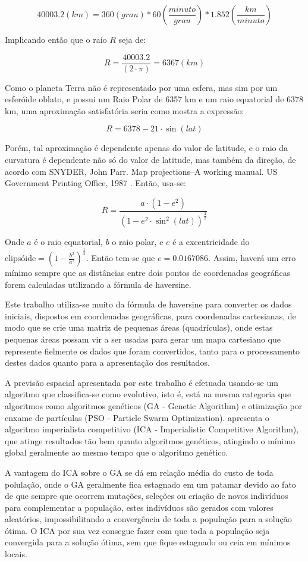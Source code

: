\[40003.2 (km) = 360(grau) * 60\left(\frac{minuto}{grau}\right) * 1.852\left(\frac{km}{minuto}\right)  \]

Implicando então que o raio \(R\) seja de:

\[R = \frac{40003.2}{(2 \cdot \pi)} = 6367 (km) \]

Como o planeta Terra não é representado por uma esfera, mas sim por um esferóide oblato, e possui um Raio Polar de 6357 km e um raio equatorial de 6378 km, uma aproximação satisfatória seria como mostra a expressão:

\[R = 6378 - 21 \cdot \sin(lat) \]

Porém, tal aproximação é dependente apenas do valor de latitude, e o raio da curvatura é dependente não só do valor de latitude, mas também da direção, de acordo com SNYDER, John Parr. Map projections--A working manual. US Government Printing Office, 1987 \cite{snyder1987map}. Então, usa-se:

\[R = \frac{ a \cdot (1 - e^2)}{ (1 - e^2 \cdot \sin^2(lat))^\frac{3}{2}}\]

Onde \(a\) é o raio equatorial, \(b\) o raio polar, e \(e\) é a excentricidade do 
\(\text{elipsóide} = \left(1 - \frac{b^2}{a^2}\right)^\frac{1}{2}\). 
Então tem-se que \(e = 0.0167086\). Assim, haverá um erro mínimo sempre que as distâncias entre dois pontos de coordenadas geográficas forem calculadas utilizando a fórmula de haversine.

Este trabalho utiliza-se muito da fórmula de haversine para converter os dados iniciais, dispostos em coordenadas geográficas, para coordenadas cartesianas, de modo que se crie uma matriz de pequenas áreas (quadrículas), onde estas pequenas áreas possam vir a ser usadas para gerar um mapa cartesiano que represente fielmente os dados que foram convertidos, tanto para o processamento destes dados quanto para a apresentação dos resultados.

A previsão espacial apresentada por este trabalho é efetuada usando-se um algoritmo que classifica-se como evolutivo, isto é, está na mesma categoria que algoritmos como algoritmos genéticos \cite{mitchell1998introduction} (GA - Genetic Algorithm) e otimização por enxame de partículas (PSO - Particle Swarm Optimization). \cite{atashpaz2007imperialist} apresenta o algoritmo imperialista competitivo (ICA - Imperialistic Competitive Algorithm), que atinge resultados tão bem quanto algoritmos genéticos, atingindo o mínimo global geralmente ao mesmo tempo que o algoritmo genético. 

A vantagem do ICA  sobre o GA se dá em relação média do custo de toda polulação, onde o GA geralmente fica estagnado em um patamar devido ao fato de que sempre que ocorrem mutações, seleções ou criação de novos indivíduos para complementar a população, estes indivíduos são gerados com valores aleatórios, impossibilitando a convergência de toda a população para a solução ótima. O ICA por sua vez consegue fazer com que toda a população seja convergida para a solução ótima, sem que fique estagnado ou ceia em mínimos locais.  

